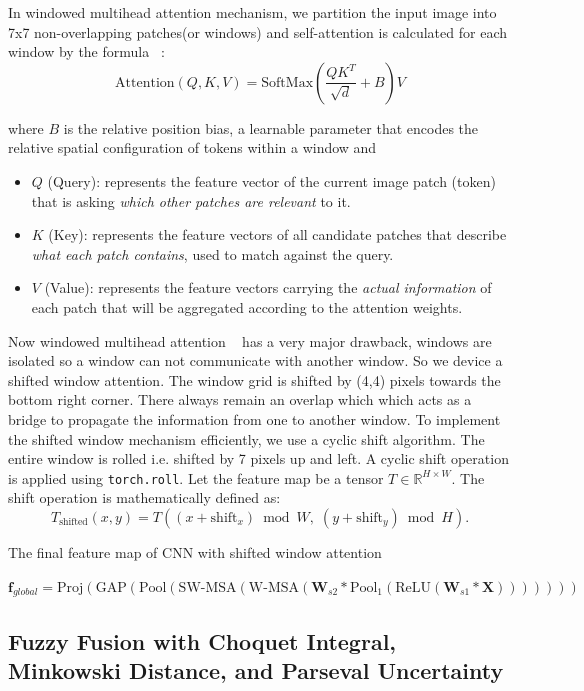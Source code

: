 \documentclass[12pt]{article}
\begin{document}
In windowed multihead attention mechanism, we partition the input image into 7x7 non-overlapping patches(or windows) and self-attention is calculated for each window by the formula ~\cite{b5}:
\[
\text{Attention}(Q, K, V) 
= \text{SoftMax}\left(\frac{QK^{T}}{\sqrt{d}} + B \right) V
\]

where $B$ is the relative position bias, a learnable parameter that encodes the relative spatial configuration of tokens within a window and
\begin{itemize}
\item $Q$ (Query): represents the feature vector of the current image patch (token) that is asking \emph{which other patches are relevant} to it.
\item $K$ (Key): represents the feature vectors of all candidate patches that describe \emph{what each patch contains}, used to match against the query.
\item $V$ (Value): represents the feature vectors carrying the \emph{actual information} of each patch that will be aggregated according to the attention weights.
\end{itemize}

Now windowed multihead attention ~\cite{b4} has a very major drawback, windows are isolated so a window can not communicate with another window. So we device a shifted window attention. The window grid is shifted by (4,4) pixels towards the bottom right corner. There always remain an overlap which which acts as a bridge to propagate the information from one to another window. To implement the shifted window mechanism efficiently, we use a cyclic shift algorithm. The entire window is rolled i.e. shifted by 7 pixels up and left. 
A cyclic shift operation is applied using \texttt{torch.roll}.  
Let the feature map be a tensor $T \in \mathbb{R}^{H \times W}$.  
The shift operation is mathematically defined as:
\[
T_{\text{shifted}}(x, y)
=
T\!\left( (x + \text{shift}_x) \bmod W,\; (y + \text{shift}_y) \bmod H \right).
\]

The final feature map of CNN with shifted window attention

$\mathbf{f}_{global} = \mathrm{Proj}(\mathrm{GAP}(\mathrm{Pool}(\mathrm{SW\text{-}MSA}(\mathrm{W\text{-}MSA}(\mathbf{W}_{s2} * \mathrm{Pool}_1(\mathrm{ReLU}(\mathbf{W}_{s1} * \mathbf{X})))))))$


\subsection{Fuzzy Fusion with Choquet Integral, Minkowski Distance, and Parseval Uncertainty}
\end{document}
